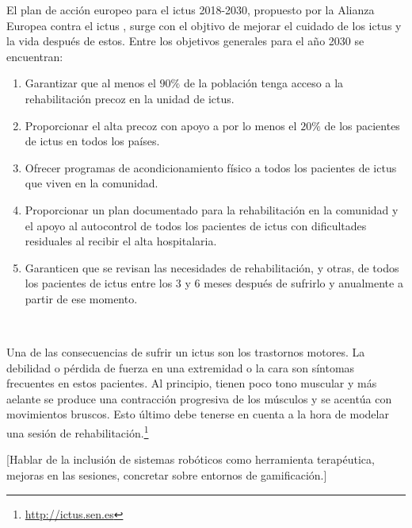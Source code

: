 El plan de acción europeo para el ictus 2018-2030, propuesto por la Alianza Europea contra el ictus \cite{perales1b}, surge con el objtivo de mejorar el cuidado de los ictus y la vida después de estos.
Entre los objetivos generales para el año 2030 se encuentran:
\begin{enumerate}
    \item Garantizar que al menos el $90\%$ de la población tenga acceso a la rehabilitación precoz en la unidad de ictus.
    \item Proporcionar el alta precoz con apoyo a por lo menos el $20\%$ de los pacientes de ictus en todos los países.
    \item Ofrecer programas de acondicionamiento físico a todos los pacientes de ictus que viven en la comunidad.
    \item Proporcionar un plan documentado para la rehabilitación en la comunidad y el apoyo al autocontrol de todos los pacientes de ictus con dificultades residuales al recibir el alta hospitalaria.
    \item Garanticen que se revisan las necesidades de rehabilitación, y otras, de todos los pacientes de ictus entre los 3 y 6 meses después de sufrirlo y anualmente a partir de ese momento.
\end{enumerate}\

Una de las consecuencias de sufrir un ictus son los trastornos motores.
La debilidad o pérdida de fuerza en una extremidad o la cara son síntomas frecuentes en estos pacientes.
Al principio, tienen poco tono muscular y más aelante se produce una contracción progresiva de los músculos y se acentúa con movimientos bruscos.
Esto último debe tenerse en cuenta a la hora de modelar una sesión de rehabilitación.\footnote{\url{http://ictus.sen.es}}

[Hablar de la inclusión de sistemas robóticos como herramienta terapéutica, mejoras en las sesiones, concretar sobre entornos de gamificación.]
